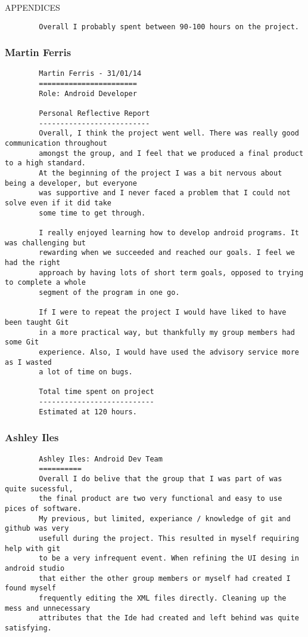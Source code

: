 \documentclass{article}
\begin{document}
\begin{section}{APPENDICES}
\begin{verbatim}
		Overall I probably spent between 90-100 hours on the project.
		\end{verbatim}
		
		\clearpage
		\subsubsection{Martin Ferris}
		\begin{verbatim}
		Martin Ferris - 31/01/14 
		=======================
		Role: Android Developer

		Personal Reflective Report
		--------------------------
		Overall, I think the project went well. There was really good communication throughout
		amongst the group, and I feel that we produced a final product to a high standard.
		At the beginning of the project I was a bit nervous about being a developer, but everyone
		was supportive and I never faced a problem that I could not solve even if it did take 
		some time to get through.

		I really enjoyed learning how to develop android programs. It was challenging but 
		rewarding when we succeeded and reached our goals. I feel we had the right 
		approach by having lots of short term goals, opposed to trying to complete a whole 
		segment of the program in one go.

		If I were to repeat the project I would have liked to have been taught Git 
		in a more practical way, but thankfully my group members had some Git 
		experience. Also, I would have used the advisory service more as I wasted 
		a lot of time on bugs.

		Total time spent on project
		---------------------------
		Estimated at 120 hours.
		\end{verbatim}
		
		\clearpage
		\subsubsection{Ashley Iles}
		\begin{verbatim}
		Ashley Iles: Android Dev Team
		==========
		Overall I do belive that the group that I was part of was quite sucessful,
		the final product are two very functional and easy to use pices of software.
		My previous, but limited, experiance / knowledge of git and github was very
		usefull during the project. This resulted in myself requiring help with git
		to be a very infrequent event. When refining the UI desing in android studio
		that either the other group members or myself had created I found myself
		frequently editing the XML files directly. Cleaning up the mess and unnecessary
		attributes that the Ide had created and left behind was quite satisfying.
		

\end{verbatim}
\end{section}
\end{document}
